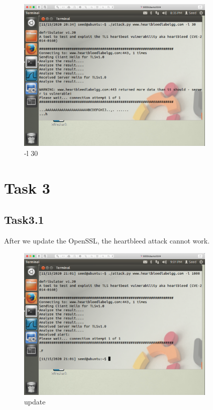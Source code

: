\documentclass[onecolumn,oneside]{SUSTechHomework}
\begin{document}
\begin{figure}[H]
  \centering
  \includegraphics[width=0.85\textwidth]{img/p7.png}
  \caption{-l 30}
\end{figure}

\section*{Task 3}

\subsection*{Task3.1}

After we update the OpenSSL, the heartbleed attack cannot work.

\begin{figure}[H]
  \centering
  \includegraphics[width=0.85\textwidth]{img/p8.png}
  \caption{update}
\end{figure}
\end{document}
